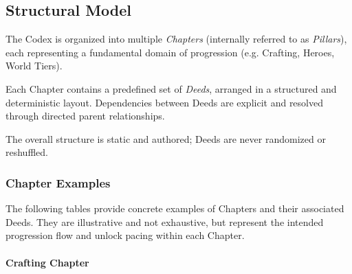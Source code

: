 \subsection{Structural Model}

The Codex is organized into multiple \emph{Chapters} (internally referred to as \emph{Pillars}),
each representing a fundamental domain of progression (e.g. Crafting, Heroes, World Tiers).

Each Chapter contains a predefined set of \emph{Deeds}, arranged in a structured and deterministic layout.
Dependencies between Deeds are explicit and resolved through directed parent relationships.

The overall structure is static and authored; Deeds are never randomized or reshuffled.

\subsubsection{Chapter Examples}

The following tables provide concrete examples of Chapters and their associated Deeds.
They are illustrative and not exhaustive, but represent the intended progression flow
and unlock pacing within each Chapter.

\paragraph{Crafting Chapter}


